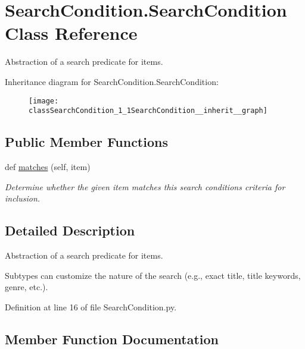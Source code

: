 \hypertarget{classSearchCondition_1_1SearchCondition}{}\section{Search\+Condition.\+Search\+Condition Class Reference}
\label{classSearchCondition_1_1SearchCondition}


Abstraction of a search predicate for items.  




Inheritance diagram for Search\+Condition.\+Search\+Condition\+:\nopagebreak
\begin{figure}[H]
\begin{center}
\leavevmode
\texttt{[image: classSearchCondition\_1\_1SearchCondition\_\_inherit\_\_graph]}
\end{center}
\end{figure}
\subsection*{Public Member Functions}
\begin{DoxyCompactItemize}
\item 
def \hyperlink{classSearchCondition_1_1SearchCondition_a3e1b1fe7a20c9b86a8716a756bb3849c}{matches} (self, item)
\begin{DoxyCompactList}\small\item\em Determine whether the given item matches this search condition\textquotesingle{}s criteria for inclusion. \end{DoxyCompactList}\end{DoxyCompactItemize}


\subsection{Detailed Description}
Abstraction of a search predicate for items. 

Subtypes can customize the nature of the search (e.\+g., exact title, title keywords, genre, etc.). 

Definition at line 16 of file Search\+Condition.\+py.



\subsection{Member Function Documentation}
\mbox{\label{classSearchCondition_1_1SearchCondition_a3e1b1fe7a20c9b86a8716a756bb3849c}} 
